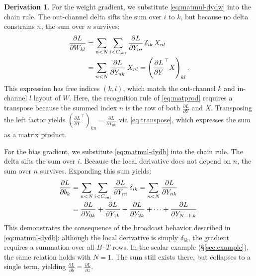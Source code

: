 \documentclass[letterpaper, 10 pt, conference]{ieeeconf}
\newcommand{\pdv}[2]{\frac{\partial #1}{\partial #2}}
\newcommand{\dL}[1]{\pdv{L}{#1}}
\newcommand{\kron}[2]{\delta_{#1 #2}}
\theoremstyle{definition}
\newtheorem*{derivation}{Derivation}
\begin{document}
\begin{derivation}
  For the weight gradient, we substitute \eqref{eq:matmul-dydw} into the chain rule. The out-channel delta sifts the sum over $i$ to $k$, but because no delta constrains $n$, the sum over $n$ survives:
  \begin{align}
    \dL{W_{kl}}
     & = \sum_{n<N} \sum_{i<C_{\text{out}}}
    \dL{Y_{ni}}\,\kron{i}{k}\,X_{nl} \notag \\
     & = \sum_{n<N} \dL{Y_{nk}}\,X_{nl}
    = \left(\dL{Y}^{\top} X\right)_{kl}.
    \label{eq:matmul-dw-idx}
  \end{align}
  This expression has free indices $(k, l)$, which match the out-channel $k$ and in-channel $l$ layout of $W$. Here, the recognition rule of \eqref{eq:matprod} requires a transpose because the summed index $n$ is the row of both $\dL{Y}$ and $X$. Transposing the left factor yields $(\dL{Y}^{\top})_{kn} = \dL{Y_{nk}}$ via \eqref{eq:transpose}, which expresses the sum as a matrix product.

  For the bias gradient, we substitute \eqref{eq:matmul-dydb} into the chain rule. The delta sifts the sum over $i$. Because the local derivative does not depend on $n$, the sum over $n$ survives. Expanding this sum yields:
  \begin{align}
    \dL{b_k}
     & = \sum_{n<N} \sum_{i<C_{\text{out}}}
    \dL{Y_{ni}}\,\kron{i}{k}
    = \sum_{n<N} \dL{Y_{nk}} \notag              \\
     & = \dL{Y_{0k}} + \dL{Y_{1k}} + \dL{Y_{2k}}
    + \cdots + \dL{Y_{N-1,k}}.
    \label{eq:matmul-db-idx}
  \end{align}
  This demonstrates the consequence of the broadcast behavior described in \eqref{eq:matmul-dydb}: although the local derivative is simply $\kron{i}{k}$, the gradient requires a summation over all $B \cdot T$ rows. In the scalar example (\S\ref{sec:example}), the same relation holds with $N = 1$. The sum still exists there, but collapses to a single term, yielding $\dL{b} = \dL{z}$.
\end{derivation}
\end{document}

